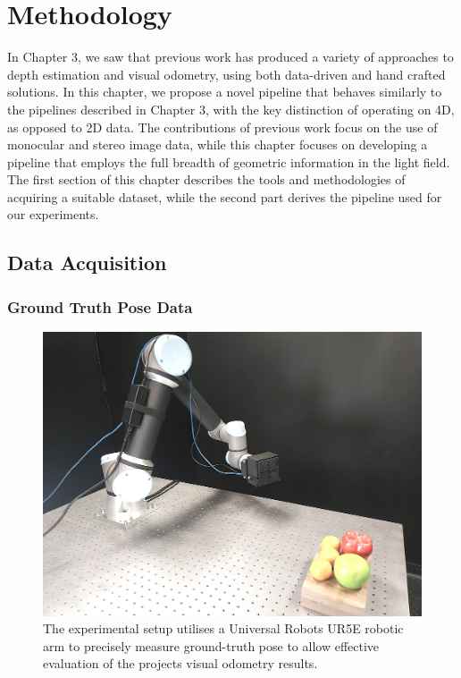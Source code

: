 \chapter{Methodology}

In Chapter 3, we saw that previous work has produced a variety of approaches to depth estimation and visual odometry, using both data-driven and hand crafted solutions. In this chapter, we propose a novel pipeline that behaves similarly to the pipelines described in Chapter 3, with the key distinction of operating on 4D, as opposed to 2D data. The contributions of previous work focus on the use of monocular and stereo image data, while this chapter focuses on developing a pipeline that employs the full breadth of geometric information in the light field. The first section of this chapter describes the tools and methodologies of acquiring a suitable dataset, while the second part derives the pipeline used for our experiments.

\section{Data Acquisition}

\subsection{Ground Truth Pose Data}

\begin{figure}[h]
    \centering 
    \includegraphics[width=4.5in]{images/experimentalsetup2.jpg}
    \caption[Experimental setup with UR5E manipulator and EpiImaging camera module]{The experimental setup utilises a Universal Robots UR5E robotic arm to precisely measure ground-truth pose to allow effective evaluation of the projects visual odometry results.}
\end{figure}

